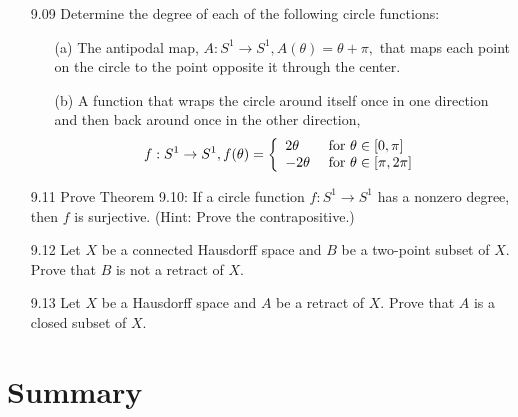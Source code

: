 \documentclass[12pt]{article}
\begin{document}
\begin{enumerate}
\begin{enumerate}
		\end{enumerate}
		
		\item[9.09] Determine the degree of each of the following circle functions:
			\begin{enumerate}
				\item[(a)] The antipodal map, $A : S ^ { 1 } \rightarrow S ^ { 1 } , A ( \theta ) = \theta + \pi ,$ that maps each point
				on the circle to the point opposite it through the center.
				
				\item[(b)] A function that wraps the circle around itself once in one direction and
				then back around once in the other direction,
					\[f : S ^ { 1 } \rightarrow S ^ { 1 } , f ( \theta ) =
					 \left\{ \begin{array}{ l l } 
						 { 2 \theta } & { \text { for } \theta \in [ 0 , \pi ] } \\
						 { - 2 \theta } & { \text { for } \theta \in [ \pi , 2 \pi ] } 
					 \end{array} \right.\]
			\end{enumerate}
		
		\item[9.11] Prove Theorem 9.10: If a circle function $f : S ^ { 1 } \rightarrow S ^ { 1 }$ has a nonzero degree,
		then $f$ is surjective. (Hint: Prove the contrapositive.)
		
		\item[9.12] Let $X$ be a connected Hausdorff space and $B$ be a two-point subset of $X .$ Prove
		that $B$ is not a retract of $X .$
		
		\item[9.13] Let $X$ be a Hausdorff space and $A$ be a retract of $X .$ Prove that $A$ is a closed
		subset of $X .$
		
	\end{enumerate}
	\section*{Summary}
	
\end{document}
